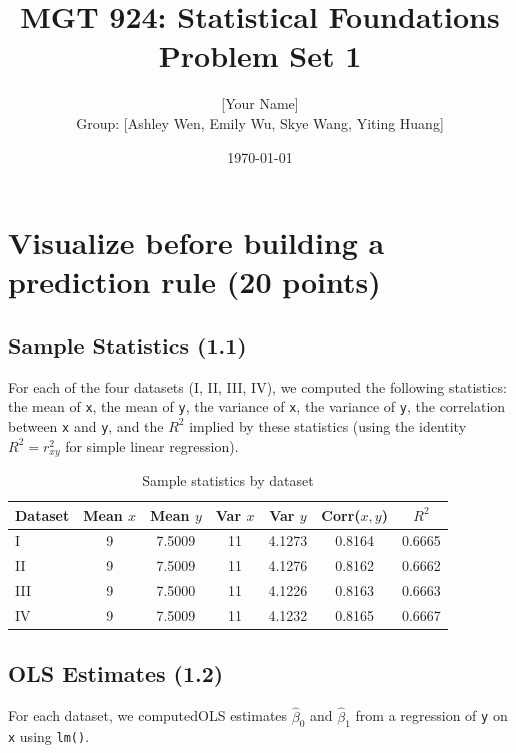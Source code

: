 \documentclass[11pt]{article}
\title{MGT 924: Statistical Foundations \\ Problem Set 1}
\author{
    [Your Name] \\
    Group: [Ashley Wen, Emily Wu, Skye Wang, Yiting Huang]
}
\date{\today}
\begin{document}
\maketitle

\section{Visualize before building a prediction rule (20 points)}

\subsection{Sample Statistics (1.1)}

For each of the four datasets (I, II, III, IV), we computed the following statistics: the mean of \texttt{x}, the mean of \texttt{y},
the variance of \texttt{x}, the variance of \texttt{y}, the correlation
between \texttt{x} and \texttt{y}, and the $R^2$ implied by these
statistics (using the identity $R^2 = r_{xy}^2$ for simple linear
regression).

\begin{table}[h]
\centering
\caption{Sample statistics by dataset}

\begin{tabular}{lcccccc}
\toprule
Dataset & Mean $x$ & Mean $y$ & Var $x$ & Var $y$ & Corr($x,y$) & $R^2$ \\
\midrule
I   & 9 & 7.5009 & 11 & 4.1273 & 0.8164 & 0.6665 \\
II  & 9 & 7.5009 & 11 & 4.1276 & 0.8162 & 0.6662 \\
III & 9 & 7.5000 & 11 & 4.1226 & 0.8163 & 0.6663 \\
IV  & 9 & 7.5009 & 11 & 4.1232 & 0.8165 & 0.6667 \\
\bottomrule
\end{tabular}

\end{table}

\subsection{OLS Estimates (1.2)}

For each dataset, we computedOLS estimates $\hat{\beta}_0$ and $\hat{\beta}_1$ from a regression of \texttt{y} on \texttt{x} using
\texttt{lm()}.
\end{document}
